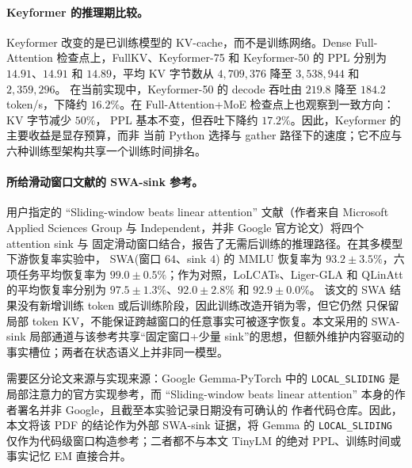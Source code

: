 \documentclass[letterpaper]{article}
\begin{document}
\paragraph{Keyformer 的推理期比较。}
Keyformer 改变的是已训练模型的 KV-cache，而不是训练网络。Dense Full-Attention
检查点上，FullKV、Keyformer-75 和 Keyformer-50 的 PPL 分别为 $14.91$、$14.91$ 和
$14.89$，平均 KV 字节数从 $4{,}709{,}376$ 降至 $3{,}538{,}944$ 和 $2{,}359{,}296$。
在当前实现中，Keyformer-50 的 decode 吞吐由 $219.8$ 降至 $184.2$ token/s，下降约
$16.2\%$。在 Full-Attention+MoE 检查点上也观察到一致方向：KV 字节减少 $50\%$，
PPL 基本不变，但吞吐下降约 $17.2\%$。因此，Keyformer 的主要收益是显存预算，而非
当前 Python 选择与 gather 路径下的速度；它不应与六种训练型架构共享一个训练时间排名。

\paragraph{所给滑动窗口文献的 SWA-sink 参考。}
用户指定的 ``Sliding-window beats linear attention'' 文献（作者来自 Microsoft Applied
Sciences Group 与 Independent，并非 Google 官方论文）将四个 attention sink 与
固定滑动窗口结合，报告了无需后训练的推理路径。在其多模型下游恢复率实验中，
SWA(窗口 $64$、sink $4$) 的 MMLU 恢复率为 $93.2\pm3.5\%$，六项任务平均恢复率为
$99.0\pm0.5\%$；作为对照，LoLCATs、Liger-GLA 和 QLinAtt 的平均恢复率分别为
$97.5\pm1.3\%$、$92.0\pm2.8\%$ 和 $92.9\pm0.0\%$\cite{jolicoeur2026sliding}。
该文的 SWA 结果没有新增训练 token 或后训练阶段，因此训练改造开销为零，但它仍然
只保留局部 token KV，不能保证跨越窗口的任意事实可被逐字恢复。本文采用的
SWA-sink 局部通道与该参考共享“固定窗口+少量 sink”的思想，但额外维护内容驱动的
事实槽位；两者在状态语义上并非同一模型。

需要区分论文来源与实现来源：Google Gemma-PyTorch 中的 
\texttt{LOCAL\_SLIDING} 是局部注意力的官方实现参考，而 ``Sliding-window beats
linear attention'' 本身的作者署名并非 Google，且截至本实验记录日期没有可确认的
作者代码仓库。因此，本文将该 PDF 的结论作为外部 SWA-sink 证据，将 Gemma 的
\texttt{LOCAL\_SLIDING} 仅作为代码级窗口构造参考；二者都不与本文 TinyLM 的绝对
PPL、训练时间或事实记忆 EM 直接合并。
\end{document}
